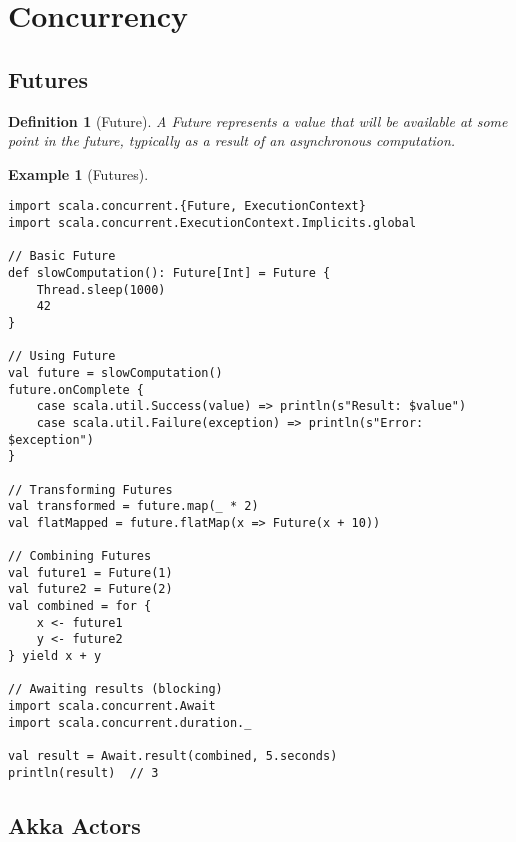 \documentclass[11pt]{article}
\newtheorem{definition}{Definition}[section]
\newtheorem{example}{Example}[section]
\begin{document}
\section{Concurrency}

\subsection{Futures}

\begin{definition}[Future]
A Future represents a value that will be available at some point in the future, typically as a result of an asynchronous computation.
\end{definition}

\begin{example}[Futures]
\begin{lstlisting}
import scala.concurrent.{Future, ExecutionContext}
import scala.concurrent.ExecutionContext.Implicits.global

// Basic Future
def slowComputation(): Future[Int] = Future {
    Thread.sleep(1000)
    42
}

// Using Future
val future = slowComputation()
future.onComplete {
    case scala.util.Success(value) => println(s"Result: $value")
    case scala.util.Failure(exception) => println(s"Error: $exception")
}

// Transforming Futures
val transformed = future.map(_ * 2)
val flatMapped = future.flatMap(x => Future(x + 10))

// Combining Futures
val future1 = Future(1)
val future2 = Future(2)
val combined = for {
    x <- future1
    y <- future2
} yield x + y

// Awaiting results (blocking)
import scala.concurrent.Await
import scala.concurrent.duration._

val result = Await.result(combined, 5.seconds)
println(result)  // 3
\end{lstlisting}
\end{example}

\subsection{Akka Actors}
\end{document}
